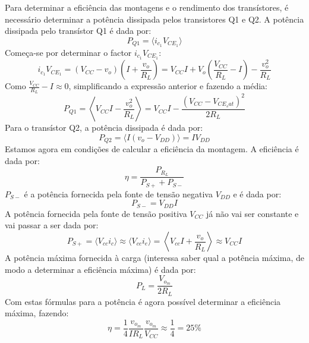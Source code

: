 \documentclass[%
  reprint,
  nofootinbib,
  amsmath,amssymb,
  aps,
  10pt,
  a4paper
]{revtex4-1}
\begin{document}
Para determinar a eficiência das montagens e o rendimento dos transístores, é necessário determinar a potência dissipada pelos transistores Q1 e Q2.
A potência dissipada pelo transístor Q1 é dada por:
\begin{equation}
P_{Q1}=\langle i_{c_1} V_{{CE}_1}\rangle
\end{equation}
Começa-se por determinar o factor $i_{c_1} V_{{CE}_1}$:
\begin{equation}
i_{c_1} V_{{CE}_1}=(V_{CC}-v_o)\left(I+\frac{v_o}{R_L}\right)=V_{CC}I+V_o\left(\frac{V_{CC}}{R_L}-I\right)-\frac{v_o^2}{R_L}
\end{equation}
Como $\frac{V_{CC}}{R_L}-I\approx0$, simplificando a expressão anterior e fazendo a média:
\begin{equation}
P_{Q1}=\left\langle V_{CC}I-\frac{v_o^2}{R_L} \right\rangle=V_{CC}I-\frac{(V_{CC}-V_{{CE}_sat})^2}{2R_L}
\end{equation}
Para o transístor Q2, a potência dissipada é dada por:
\begin{equation}
P_{Q2}=\langle I(v_o-V_{DD}) \rangle=IV_{DD}
\end{equation}
Estamos agora em condições de calcular a eficiência da montagem. A eficiência é dada por:
\begin{equation}
\eta=\frac{P_{R_L}}{P_{S+}+P_{S-}}
\end{equation}
$P_{S-}$ é a potência fornecida pela fonte de tensão negativa $V_{DD}$ e é dada por:
\begin{equation}
P_{S-}=V_{DD}I
\end{equation}
A potência fornecida pela fonte de tensão positiva $V_{CC}$ já não vai ser constante e vai passar a ser dada por:
\begin{equation}
P_{S+}=\langle V_{cc} i_c \rangle \approx \langle V_{cc} i_e \rangle =\left\langle V_{cc} I+\frac{v_o}{R_L} \right\rangle \approx V_{CC}I
\end{equation}
A potência máxima fornecida à carga (interessa saber qual a potência máxima, de modo a determinar a eficiência máxima) é dada por:
\begin{equation}
P_{L}=\frac{V_{o_m}}{2R_L}
\end{equation}
Com estas fórmulas para a potência é agora possível determinar a eficiência máxima, fazendo:
\begin{equation}
\eta=\frac{1}{4}\frac{v_{o_m}}{IR_L}\frac{v_{o_m}}{V_{CC}}\approx\frac{1}{4}=25\%
\end{equation}

\end{document}
